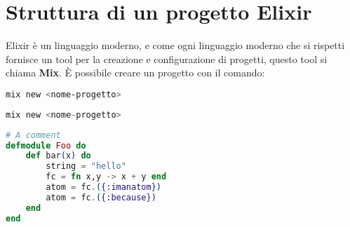 \section{Struttura di un progetto Elixir}

Elixir è un linguaggio moderno, e come ogni linguaggio moderno che
si rispetti fornisce un tool per la creazione e configurazione di
progetti, questo tool si chiama \textbf{Mix}.
È possibile creare un progetto con il comando:


\begin{lstlisting}[language=bash]
mix new <nome-progetto>
\end{lstlisting}

\begin{lstlisting}[language=elixir]
	mix new <nome-progetto>
\end{lstlisting}

\begin{lstlisting}[language=elixir, caption={Super fancy code},captionpos=b]
# A comment
defmodule Foo do
    def bar(x) do
        string = "hello"
        fc = fn x,y -> x + y end
        atom = fc.({:imanatom})
        atom = fc.({:because})
    end
end
\end{lstlisting}
